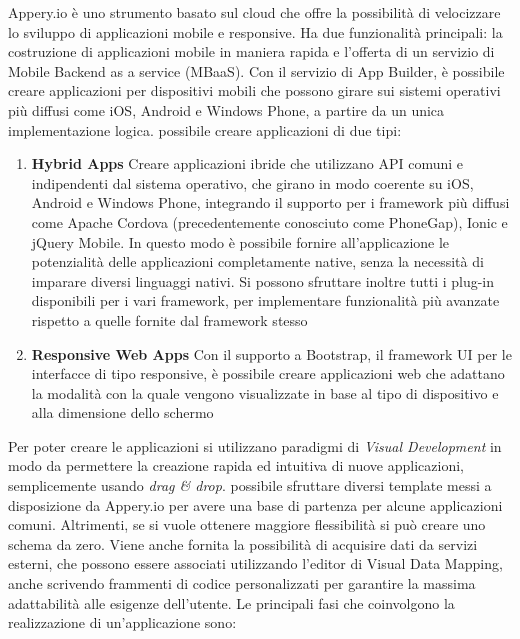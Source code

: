 Appery.io è uno strumento basato sul cloud che offre la possibilità di velocizzare lo sviluppo di applicazioni mobile e responsive. Ha due funzionalità principali: la costruzione di applicazioni mobile in maniera rapida e l'offerta di un servizio di Mobile Backend as a service (MBaaS).
Con il servizio di App Builder, è possibile creare applicazioni per dispositivi mobili che possono girare sui sistemi operativi più diffusi come iOS, Android e Windows Phone, a partire da un unica implementazione logica.
\upe possibile creare applicazioni di due tipi: 
\begin{enumerate}
	\item \textbf{Hybrid Apps} Creare applicazioni ibride che utilizzano API comuni e indipendenti dal sistema operativo, che girano in modo coerente su iOS, Android e Windows Phone, integrando il supporto per i framework più diffusi come Apache Cordova (precedentemente conosciuto come PhoneGap), Ionic e jQuery Mobile. In questo modo è possibile fornire all'applicazione le potenzialità delle applicazioni completamente native, senza la necessità di imparare diversi linguaggi nativi. Si possono sfruttare inoltre tutti i plug-in disponibili per i vari framework, per implementare funzionalità più avanzate rispetto a quelle fornite dal framework stesso
	\item \textbf{Responsive Web Apps}
	Con il supporto a Bootstrap, il framework UI per le interfacce di tipo responsive, è possibile creare applicazioni web che adattano la modalità con la quale vengono visualizzate in base al tipo di dispositivo e alla dimensione dello schermo
\end{enumerate}

Per poter creare le applicazioni si utilizzano paradigmi di \emph{Visual Development} in modo da permettere la creazione rapida ed intuitiva di nuove applicazioni, semplicemente usando \emph{drag \& drop}. \upe possibile sfruttare diversi template messi a disposizione da Appery.io per avere una base di partenza per alcune applicazioni comuni. Altrimenti, se si vuole ottenere maggiore flessibilità si può creare uno schema da zero. Viene anche fornita la possibilità di acquisire dati da servizi esterni, che possono essere associati utilizzando l'editor di Visual Data Mapping, anche scrivendo frammenti di codice personalizzati per garantire la massima adattabilità alle esigenze dell'utente. Le principali fasi che coinvolgono la realizzazione di un'applicazione sono:

